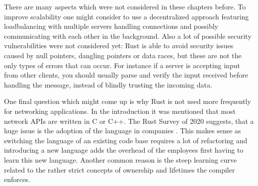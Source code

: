 There are many aspects which were not considered in these chapters before. To improve scalability one might consider to
use a decentralized approach featuring loadbalancing with multiple servers handling connections and possibly
communicating with each other in the background. Also a lot of possible security vulnerabilities were not considered
yet: Rust is able to avoid security issues caused by null pointers, dangling pointers or data races, but these are not
the only types of errors that can occur. For instance if a server is accepting input from other clients, you should
usually parse and verify the input received before handling the message, instead of blindly trusting the incoming data.

One final question which might come up is why Rust is not used more frequently for networking applications. In the
introduction it was mentioned that most network APIs are written in C or C++. The Rust Survey of 2020 suggests, that a
huge issue is the adoption of the language in companies \cite{rust-survey}. This makes sense as switching the language
of an existing code base requires a lot of refactoring and introducing a new language adds the overhead of the
employees first having to learn this new language. Another common reason is the steep learning curve related to the
rather strict concepts of ownership and lifetimes the compiler enforces.
